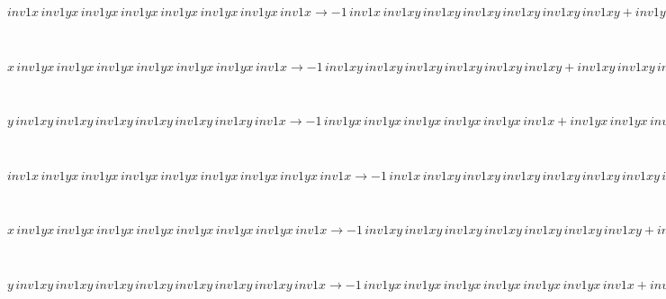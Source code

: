 \begin{minipage}{6in}
$
inv1x\,
 inv1yx\,
 inv1yx\,
 inv1yx\,
 inv1yx\,
 inv1yx\,
 inv1yx\,
 inv1x\rightarrow -1\,
 inv1x\,
 inv1xy\,
 inv1xy\,
 inv1xy\,
 inv1xy\,
 inv1xy\,
 inv1xy + inv1yx\,
 inv1yx\,
 inv1yx\,
 inv1yx\,
 inv1yx\,
 inv1yx\,
 inv1x + inv1x\,
 inv1xy\,
 inv1xy\,
 inv1xy\,
 inv1xy\,
 inv1xy\,
 inv1xy\,
 inv1x
$
\end{minipage}\medskip \\
\begin{minipage}{6in}
$
x\,
 inv1yx\,
 inv1yx\,
 inv1yx\,
 inv1yx\,
 inv1yx\,
 inv1yx\,
 inv1x\rightarrow -1\,
 inv1xy\,
 inv1xy\,
 inv1xy\,
 inv1xy\,
 inv1xy\,
 inv1xy + inv1xy\,
 inv1xy\,
 inv1xy\,
 inv1xy\,
 inv1xy\,
 inv1xy\,
 inv1x
$
\end{minipage}\medskip \\
\begin{minipage}{6in}
$
y\,
 inv1xy\,
 inv1xy\,
 inv1xy\,
 inv1xy\,
 inv1xy\,
 inv1xy\,
 inv1x\rightarrow -1\,
 inv1yx\,
 inv1yx\,
 inv1yx\,
 inv1yx\,
 inv1yx\,
 inv1x + inv1yx\,
 inv1yx\,
 inv1yx\,
 inv1yx\,
 inv1yx\,
 inv1yx\,
 inv1x + y\,
 inv1xy\,
 inv1xy\,
 inv1xy\,
 inv1xy\,
 inv1xy\,
 inv1xy
$
\end{minipage}\medskip \\
\begin{minipage}{6in}
$
inv1x\,
 inv1yx\,
 inv1yx\,
 inv1yx\,
 inv1yx\,
 inv1yx\,
 inv1yx\,
 inv1yx\,
 inv1x\rightarrow -1\,
 inv1x\,
 inv1xy\,
 inv1xy\,
 inv1xy\,
 inv1xy\,
 inv1xy\,
 inv1xy\,
 inv1xy + inv1yx\,
 inv1yx\,
 inv1yx\,
 inv1yx\,
 inv1yx\,
 inv1yx\,
 inv1yx\,
 inv1x + inv1x\,
 inv1xy\,
 inv1xy\,
 inv1xy\,
 inv1xy\,
 inv1xy\,
 inv1xy\,
 inv1xy\,
 inv1x
$
\end{minipage}\medskip \\
\begin{minipage}{6in}
$
x\,
 inv1yx\,
 inv1yx\,
 inv1yx\,
 inv1yx\,
 inv1yx\,
 inv1yx\,
 inv1yx\,
 inv1x\rightarrow -1\,
 inv1xy\,
 inv1xy\,
 inv1xy\,
 inv1xy\,
 inv1xy\,
 inv1xy\,
 inv1xy + inv1xy\,
 inv1xy\,
 inv1xy\,
 inv1xy\,
 inv1xy\,
 inv1xy\,
 inv1xy\,
 inv1x
$
\end{minipage}\medskip \\
\begin{minipage}{6in}
$
y\,
 inv1xy\,
 inv1xy\,
 inv1xy\,
 inv1xy\,
 inv1xy\,
 inv1xy\,
 inv1xy\,
 inv1x\rightarrow -1\,
 inv1yx\,
 inv1yx\,
 inv1yx\,
 inv1yx\,
 inv1yx\,
 inv1yx\,
 inv1x + inv1yx\,
 inv1yx\,
 inv1yx\,
 inv1yx\,
 inv1yx\,
 inv1yx\,
 inv1yx\,
 inv1x + y\,
 inv1xy\,
 inv1xy\,
 inv1xy\,
 inv1xy\,
 inv1xy\,
 inv1xy\,
 inv1xy
$
\end{minipage}\medskip \\
